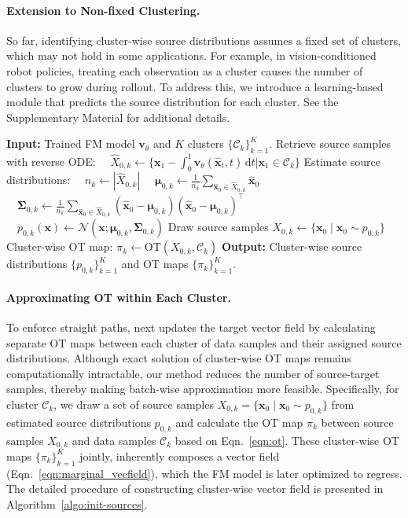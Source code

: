 \paragraph{Extension to Non-fixed Clustering.}
So far, identifying cluster-wise source distributions assumes a fixed set of clusters, which may not hold in some applications. For example, in vision-conditioned robot policies, treating each observation as a cluster causes the number of clusters to grow during rollout. To address this, we introduce a learning-based module that predicts the source distribution for each cluster. See the Supplementary Material for additional details.

\begin{algorithm}[t]
\caption{Constructing the cluster-wise vector field}
\label{algo:init-sources}
\begin{algorithmic}[1]
\STATE \textbf{Input:} Trained FM model $\bm{v}_\theta$ and $K$ clusters $\{\mathcal{C}_k\}_{k=1}^K$.
    \STATE Retrieve source samples with reverse ODE:
    \STATE $\quad \hat{X}_{0, k} \leftarrow \{\bm{x}_{1} - \int_0^1 \bm{v}_\theta(\hat{\bm{x}}_t, t) \, \mathrm{d}t | \bm{x}_{1} \in \mathcal{C}_k\}$
    \STATE Estimate source distributions:
    \STATE $\quad n_k \leftarrow |\hat{X}_{0, k}|$
    \STATE $\quad \bm{\mu}_{0, k} \leftarrow \frac{1}{n_k}\sum_{\hat{\bm{x}}_0 \in \hat{X}_{0, k}} \hat{\bm{x}}_0$
    \STATE $\quad \bm{\Sigma}_{0, k} \leftarrow \frac{1}{n_k} \sum_{\hat{\bm{x}}_0 \in \hat{X}_{0, k}} (\hat{\bm{x}}_0 - \bm{\mu}_{0, k})(\hat{\bm{x}}_0 - \bm{\mu}_{0, k})^\top$
    \STATE $\quad p_{0, k}(\bm{x}) \leftarrow \mathcal{N}(\bm{x}; \bm{\mu}_{0, k}, \bm{\Sigma}_{0, k})$
    \STATE Draw source samples $X_{0,k} \leftarrow \{\bm{x}_{0} \mid \bm{x}_{0} \sim p_{0,k}\}$
    \STATE Cluster-wise OT map: $\pi_k \leftarrow \text{OT}(X_{0,k}, \mathcal{C}_k)$
\ENDFOR
\STATE \textbf{Output:} Cluster-wise source distributions $\{p_{0,k}\}_{k=1}^K$ and OT maps $\{\pi_{k}\}_{k=1}^K$.
\end{algorithmic}
\end{algorithm}

\paragraph{Approximating OT within Each Cluster.}
To enforce straight paths, \method{} next updates the target vector field by calculating separate OT maps between each cluster of data samples and their assigned source distributions.  Although exact solution of cluster-wise OT maps remains computationally intractable, our method reduces the number of source-target samples, thereby making batch-wise approximation more feasible.  Specifically, for cluster $\mathcal{C}_k$, we draw a set of source samples $X_{0,k} = \{\bm{x}_{0} \mid \bm{x}_{0} \sim p_{0,k}\}$ from estimated source distributions $p_{0,k}$ and calculate the OT map $\pi_k$ between source samples $X_{0,k}$ and data samples $\mathcal{C}_k$ based on Eqn.~\ref{eqn:ot}.  These cluster-wise OT maps $\{\pi_k\}_{k=1}^K$ jointly, inherently composes a vector field (Eqn.~\ref{eqn:marginal_vecfield}), which the FM model is later optimized to regress.  The detailed procedure of constructing cluster-wise vector field is presented in Algorithm~\ref{algo:init-sources}.


